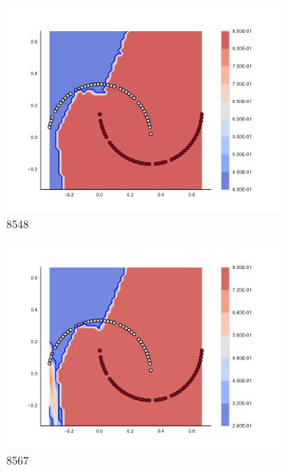\begin{figure}[h]
\begin{subfigure}[b]{0.09\textwidth}
    \includegraphics[clip, trim=2.35cm 1.75cm 4.5cm 0cm,width=\textwidth]{img/convergence/8548.pdf}
    \caption{8548}
    \label{fig:convergence_8548}
\end{subfigure}
%
\begin{subfigure}[b]{0.09\textwidth}
    \includegraphics[clip, trim=2.35cm 1.75cm 4.5cm 0cm,width=\textwidth]{img/convergence/8567.pdf}
    \caption{8567}
    \label{fig:convergence_8567}
\end{subfigure}
%
\begin{subfigure}[b]{0.09\textwidth}

\end{subfigure}
\end{figure}
